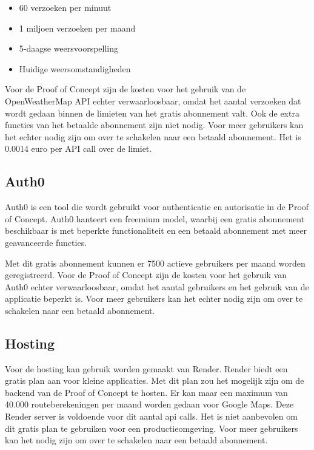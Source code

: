 \begin{itemize}
    \item 60 verzoeken per minuut
    \item 1 miljoen verzoeken per maand
    \item 5-daagse weersvoorspelling
    \item Huidige weersomstandigheden
\end{itemize}

Voor de Proof of Concept zijn de kosten voor het gebruik van de OpenWeatherMap API echter verwaarloosbaar, omdat het aantal verzoeken dat wordt gedaan binnen de limieten van het gratis abonnement valt. Ook de extra functies van het betaalde abonnement zijn niet nodig. Voor meer gebruikers kan het echter nodig zijn om over te schakelen naar een betaald abonnement.  Het is 0.0014 euro per API call over de limiet.

\subsection*{Auth0}

Auth0 is een tool die wordt gebruikt voor authenticatie en autorisatie in de Proof of Concept. Auth0 hanteert een freemium model, waarbij een gratis abonnement beschikbaar is met beperkte functionaliteit en een betaald abonnement met meer geavanceerde functies.

Met dit gratis abonnement kunnen er 7500 actieve gebruikers per maand worden geregistreerd. Voor de Proof of Concept zijn de kosten voor het gebruik van Auth0 echter verwaarloosbaar, omdat het aantal gebruikers en het gebruik van de applicatie beperkt is. Voor meer gebruikers kan het echter nodig zijn om over te schakelen naar een betaald abonnement.

\subsection*{Hosting}

Voor de hosting kan gebruik worden gemaakt van Render. Render biedt een gratis plan aan voor kleine applicaties. Met dit plan zou het mogelijk zijn om de backend van de Proof of Concept te hosten. Er kan maar een maximum van 40.000 routeberekeningen per maand worden gedaan voor Google Maps. Deze Render server is voldoende voor dit aantal api calls. Het is niet aanbevolen om dit gratis plan te gebruiken voor een productieomgeving. Voor meer gebruikers kan het nodig zijn om over te schakelen naar een betaald abonnement.

